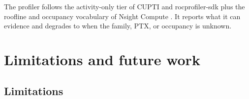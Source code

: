 The profiler follows the activity-only tier of CUPTI and rocprofiler-sdk plus
the roofline and occupancy vocabulary of Nsight Compute
\citep{nsightComputeSOL}. It reports what it can evidence and degrades to
 when the family, PTX, or occupancy is unknown.

\section{Limitations and future work}
\label{sec:limits}

\subsection{Limitations}
\label{sec:limitations-list}

